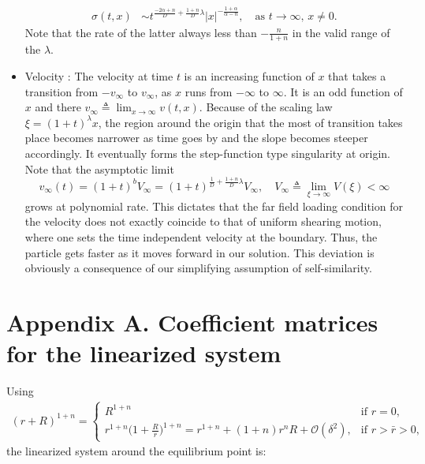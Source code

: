 \documentclass[a4paper,11pt]{article}
\begin{document}
\begin{itemize}
\begin{align*}
 \sigma(t,x) &\sim t^{\frac{-2\alpha+n}{D} +\frac{1+n}{D}\lambda}|x|^{-\frac{1+\alpha}{\alpha-n}}, \quad \text{as $t \rightarrow \infty$, $x\ne0$.}
\end{align*}
Note that the rate of the latter always less than $-\frac{n}{1+n}$ in the valid range of the $\lambda$.
\item Velocity : The velocity at time $t$ is an increasing function of $x$ that takes a transition from $-v_\infty$ to $v_\infty$, as $x$ runs from $-\infty$ to $\infty$. It is an odd function of $x$ and there $v_\infty\triangleq \lim_{x \rightarrow \infty} v(t,x)$. Because of the scaling law $\xi=(1+t)^\lambda x$, the region around the origin that the  most of transition takes place becomes narrower as time goes by and the slope becomes steeper accordingly. It eventually forms the step-function type singularity at origin. Note that the asymptotic limit $$v_\infty(t)=(1+t)^{b}V_\infty = (1+t)^{\frac{1}{D} + \frac{1+n}{D}\lambda}V_\infty, \quad V_\infty \triangleq \lim_{\xi \rightarrow \infty} V(\xi) <\infty$$
grows at polynomial rate. This dictates that the far field loading condition for the velocity does not exactly coincide to that of uniform shearing motion, where one sets the time independent velocity at the boundary. Thus, the particle gets faster as it moves forward in our solution. This deviation is obviously a consequence of our simplifying assumption of self-similarity.
\end{itemize}

\section*{Appendix A. Coefficient matrices for the linearized system} \label{append:linear}
Using
\begin{align*}
 (r+R)^{1+n} = \begin{cases}
                R^{1+n} &\text{if $r=0$},\\
                r^{1+n}\Big(1+\frac{R}{r}\Big)^{1+n} = r^{1+n} + (1+n)r^nR + \mathcal{O}(\delta^2), & \text{if $r>\bar{r}>0$,}
               \end{cases}
\end{align*}
the linearized system around the equilibrium point is:
\end{document}
